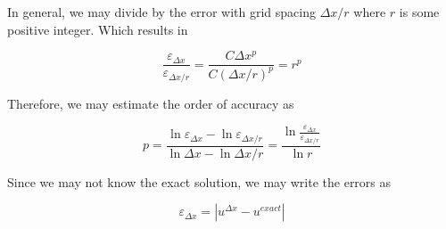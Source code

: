 \documentclass[11pt]{article}
\begin{document}
In general, we may divide by the error with grid spacing $\Delta x/r$ where $r$ is some positive integer. Which results in

\begin{equation}
	\frac{\varepsilon_{\Delta x}}{\varepsilon_{\Delta x/r}}
	=
	\frac{C \Delta x^p}{C (\Delta x/r)^p}
	=
	r^p
\end{equation}

Therefore, we may estimate the order of accuracy as

\begin{equation}
	p
	=
	\frac
	{
	\ln{\varepsilon_{\Delta x}}
	-
	\ln{\varepsilon_{\Delta x/r}}
	}
	{
	\ln{\Delta x}
	-
	\ln{\Delta x/r}
	}
	=
	\frac{\ln{\frac{\varepsilon_{\Delta x}}{\varepsilon_{\Delta x/r}}}}
	{\ln r}
\end{equation}

Since we may not know the exact solution, we may write the errors as

\begin{equation}
	\varepsilon_{\Delta x}
	=
	|u^{\Delta x} - u^{exact}|
\end{equation}
\end{document}
